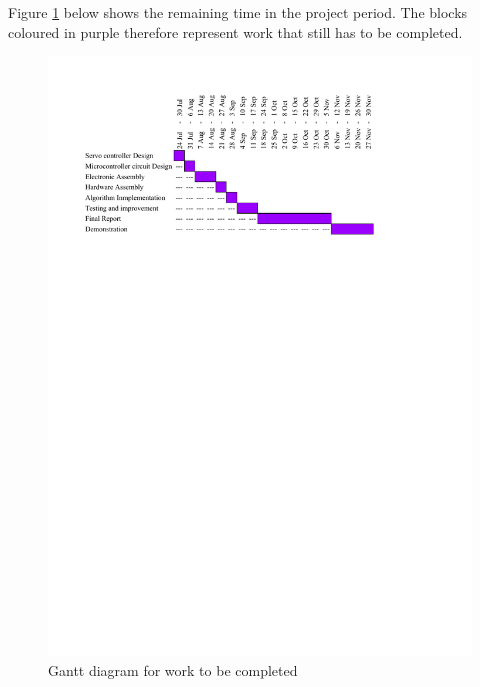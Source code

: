 Figure \ref{fig:Gantt2} below shows the remaining time in the project period. The blocks coloured in purple therefore represent work that still has to be completed.

\FloatBarrier
\begin{figure}[H]
    \centering
        \includegraphics[clip, trim=1.5cm 21cm 1.5cm 1.5cm, width=1.00\textwidth]{pics/Gantt2.pdf}
    \caption{Gantt diagram for work to be completed}
    \label{fig:Gantt2}
\end{figure}
\FloatBarrier




